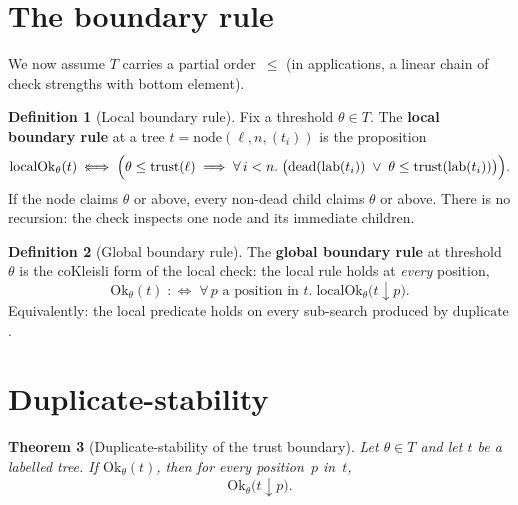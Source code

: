 \documentclass[11pt,a4paper]{article}
\theoremstyle{plain}
\newtheorem{theorem}{Theorem}[section]
\theoremstyle{definition}
\newtheorem{definition}[theorem]{Definition}
\newcommand{\Ok}{\mathrm{Ok}}
\newcommand{\localOk}{\mathrm{localOk}}
\begin{document}
\section{The boundary rule}

We now assume $T$ carries a partial order~$\le$ (in applications, a
linear chain of check strengths with bottom element).

\begin{definition}[Local boundary rule]\label{def:localok}
Fix a threshold $\theta \in T$. The \textbf{local boundary rule} at a
tree $t = \mathrm{node}(\ell, n, (t_i))$ is the proposition
\begin{equation}
  \localOk_\theta(t)
  \;:\!\!\Longleftrightarrow\;
  \Bigl(
    \theta \le \mathrm{trust}(\ell)
    \;\Longrightarrow\;
    \forall\, i < n.\;
    \bigl(
      \mathrm{dead}(\mathrm{lab}(t_i))
      \;\lor\;
      \theta \le \mathrm{trust}(\mathrm{lab}(t_i))
    \bigr)
  \Bigr).
\end{equation}
If the node claims $\theta$ or above, every non-dead child claims $\theta$
or above. There is no recursion: the check inspects one node and its
immediate children.
\end{definition}

\begin{definition}[Global boundary rule]\label{def:ok}
The \textbf{global boundary rule} at threshold~$\theta$ is the
coKleisli form of the local check: the local rule holds at
\emph{every} position,
\begin{equation}
  \Ok_\theta(t)
  \;:\!\!\Longleftrightarrow\;
  \forall\, p \text{ a position in } t.\;
  \localOk_\theta\bigl(t \mathbin{\downarrow} p\bigr).
\end{equation}
Equivalently: the local predicate holds on every sub-search produced by
$\mathrm{duplicate}$.
\end{definition}

\section{Duplicate-stability}

\begin{theorem}[Duplicate-stability of the trust boundary]
\label{thm:ok-sub}
Let $\theta \in T$ and let $t$ be a labelled tree. If $\Ok_\theta(t)$,
then for every position~$p$ in~$t$,
\begin{equation}
  \Ok_\theta\bigl(t \mathbin{\downarrow} p\bigr).
\end{equation}
\end{theorem}
\end{document}
